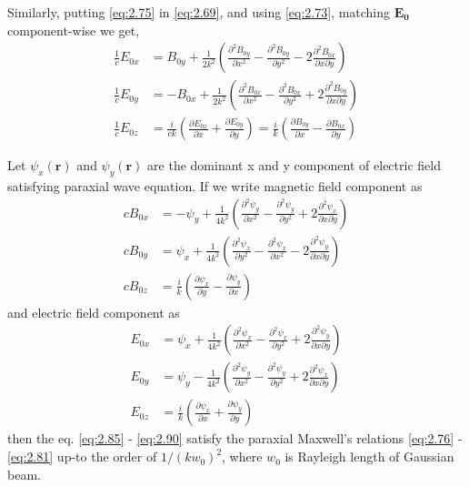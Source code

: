 \documentclass[11pt,a4paper]{article}
\numberwithin{equation}{section}
\begin{document}
Similarly, putting \ref{eq:2.75} in \ref{eq:2.69}, and using \ref{eq:2.73}, matching $\boldsymbol{E_0}$ component-wise we get,
\begin{align}
	\frac{1}{c}E_{0x} &=
	 B_{0y} + \frac{1}{2k^2}\left( \frac{\partial^2 B_{0y}}{\partial x^2} - \frac{\partial^2 B_{0y}}{\partial y^2} - 2\frac{\partial^2 B_{0x}}{\partial x\partial y} \right)\\
	\frac{1}{c}E_{0y} &= 
	-B_{0x} + \frac{1}{2k^2}\left( \frac{\partial^2 B_{0x}}{\partial x^2} - \frac{\partial^2 B_{0x}}{\partial y^2} + 2\frac{\partial^2 B_{0y}}{\partial x\partial y} \right)\\
	\frac{1}{c}E_{0z} &= \frac{i}{ck}\left(\frac{\partial E_{0x}}{\partial x}+ \frac{\partial E_{0y}}{\partial y}\right) = \frac{i}{k}\left(\frac{\partial B_{0y}}{\partial x}-\frac{\partial B_{0x}}{\partial y}\right)\label{eq:2.81}
\end{align}

Let $\psi_x(\boldsymbol{r})$ and $\psi_y(\boldsymbol{r})$ are the dominant x and y component of electric field satisfying paraxial wave equation. If we write magnetic field component as \cite{erikson 94}
\begin{align}
	cB_{0x} &= 
	-\psi_y + \frac{1}{4k^2}\left( \frac{\partial^2 \psi_y}{\partial x^2} - \frac{\partial^2 \psi_y}{\partial y^2} + 2\frac{\partial^2 \psi_x}{\partial x\partial y} \right)\label{eq:2.85}\\
	cB_{0y} &= 
	\psi_x + \frac{1}{4k^2}\left( \frac{\partial^2 \psi_x}{\partial y^2} - \frac{\partial^2 \psi_x}{\partial x^2} - 2\frac{\partial^2 \psi_y}{\partial x\partial y} \right)\\
	cB_{0z} &= 
	\frac{i}{k}\left(\frac{\partial \psi_x}{\partial y}-\frac{\partial \psi_y}{\partial x}\right)
\end{align}
and electric field component as \cite{erikson 94}
\begin{align}
	E_{0x} &=
	\psi_x + \frac{1}{4k^2}\left( \frac{\partial^2 \psi_x}{\partial x^2} - \frac{\partial^2 \psi_x}{\partial y^2} + 2\frac{\partial^2 \psi_y}{\partial x\partial y} \right)\\
	E_{0y} &= 
	\psi_y - \frac{1}{4k^2}\left( \frac{\partial^2 \psi_y}{\partial x^2} - \frac{\partial^2 \psi_y}{\partial y^2} + 2\frac{\partial^2 \psi_x}{\partial x\partial y} \right)\\
	E_{0z} &= 
	\frac{i}{k}\left(\frac{\partial \psi_x}{\partial x}+\frac{\partial \psi_y}{\partial y}\right)\label{eq:2.90}
\end{align}
then the eq. \ref{eq:2.85} - \ref{eq:2.90} satisfy the paraxial Maxwell's relations \ref{eq:2.76} - \ref{eq:2.81} up-to the order of $1/(kw_0)^2$, where $w_0$ is Rayleigh length of Gaussian beam.
\end{document}
